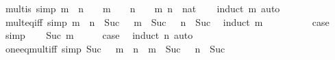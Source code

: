 \begin{isabellebody}
%
\endisadelimdocument
%
\isatagdocument
%
\isamarkuptrue%
%
\endisatagdocument
{\isafolddocument}%
%
\isadelimdocument
%
\endisadelimdocument
{}\isamarkupfalse%
\ mult{\isacharunderscore}{\kern0pt}is{\isacharunderscore}{\kern0pt}{}\ {\isacharbrackleft}{\kern0pt}simp{\isacharbrackright}{\kern0pt}{\isacharcolon}{\kern0pt}\ {\isachardoublequoteopen}m\ {\isacharasterisk}{\kern0pt}\ n\ {\isacharequal}{\kern0pt}\ {}\ {\isasymlongleftrightarrow}\ m\ {\isacharequal}{\kern0pt}\ {}\ {\isasymor}\ n\ {\isacharequal}{\kern0pt}\ {}{\isachardoublequoteclose}\ \ m\ n\ {\isacharcolon}{\kern0pt}{\isacharcolon}{\kern0pt}\ nat\isanewline
%
\isadelimproof
\ \ %
\endisadelimproof
%
\isatagproof
{}\isamarkupfalse%
\ {\isacharparenleft}{\kern0pt}induct\ m{\isacharparenright}{\kern0pt}\ auto%
\endisatagproof
{\isafoldproof}%
%
\isadelimproof
\isanewline
%
\endisadelimproof
\isanewline
{}\isamarkupfalse%
\ mult{\isacharunderscore}{\kern0pt}eq{\isacharunderscore}{\kern0pt}{}{\isacharunderscore}{\kern0pt}iff\ {\isacharbrackleft}{\kern0pt}simp{\isacharbrackright}{\kern0pt}{\isacharcolon}{\kern0pt}\ {\isachardoublequoteopen}m\ {\isacharasterisk}{\kern0pt}\ n\ {\isacharequal}{\kern0pt}\ Suc\ {}\ {\isasymlongleftrightarrow}\ m\ {\isacharequal}{\kern0pt}\ Suc\ {}\ {\isasymand}\ n\ {\isacharequal}{\kern0pt}\ Suc\ {}{\isachardoublequoteclose}\isanewline
%
\isadelimproof
%
\endisadelimproof
%
\isatagproof
{}\isamarkupfalse%
\ {\isacharparenleft}{\kern0pt}induct\ m{\isacharparenright}{\kern0pt}\isanewline
\ \ \isamarkupfalse%
\ {}\isanewline
\ \ \isamarkupfalse%
\ \isamarkupfalse%
\ {\isacharquery}{\kern0pt}case\ \isamarkupfalse%
\ simp\isanewline
{}\isamarkupfalse%
\isanewline
\ \ \isamarkupfalse%
\ {\isacharparenleft}{\kern0pt}Suc\ m{\isacharparenright}{\kern0pt}\isanewline
\ \ \isamarkupfalse%
\ \isamarkupfalse%
\ {\isacharquery}{\kern0pt}case\ \isamarkupfalse%
\ {\isacharparenleft}{\kern0pt}induct\ n{\isacharparenright}{\kern0pt}\ auto\isanewline
{}\isamarkupfalse%
%
\endisatagproof
{\isafoldproof}%
%
\isadelimproof
\isanewline
%
\endisadelimproof
\isanewline
{}\isamarkupfalse%
\ one{\isacharunderscore}{\kern0pt}eq{\isacharunderscore}{\kern0pt}mult{\isacharunderscore}{\kern0pt}iff\ {\isacharbrackleft}{\kern0pt}simp{\isacharbrackright}{\kern0pt}{\isacharcolon}{\kern0pt}\ {\isachardoublequoteopen}Suc\ {}\ {\isacharequal}{\kern0pt}\ m\ {\isacharasterisk}{\kern0pt}\ n\ {\isasymlongleftrightarrow}\ m\ {\isacharequal}{\kern0pt}\ Suc\ {}\ {\isasymand}\ n\ {\isacharequal}{\kern0pt}\ Suc\ {}{\isachardoublequoteclose}\isanewline

\end{isabellebody}
